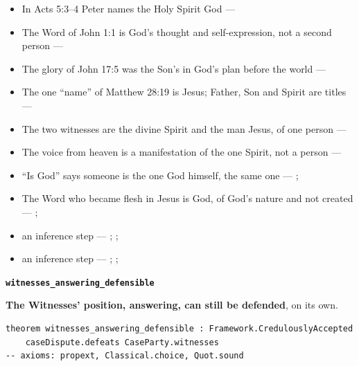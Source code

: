 \documentclass[11pt,paper=\testimonypaper,DIV=13,parskip=false]{scrartcl}
\begin{document}
\begin{itemize}
\begin{itemize}
\item In Acts 5:3–4 Peter names the Holy Spirit God --- \cite[198]{calvin-commentary-acts-1844}
\item The Word of John 1:1 is God’s thought and self-expression, not a second person --- \cite[ch. 4 and 8, on John 1:1]{bernard-oneness-of-god-1983}
\item The glory of John 17:5 was the Son’s in God’s plan before the world --- \cite[ch. 8, The Preexistence of Jesus]{bernard-oneness-of-god-1983}
\item The one “name” of Matthew 28:19 is Jesus; Father, Son and Spirit are titles --- \cite[ch. 6, Matthew 28:19]{bernard-oneness-of-god-1983}
\item The two witnesses are the divine Spirit and the man Jesus, of one person --- \cite[ch. 8, Two Witnesses]{bernard-oneness-of-god-1983}
\item The voice from heaven is a manifestation of the one Spirit, not a person --- \cite[ch. 8, The Voice from Heaven]{bernard-oneness-of-god-1983}
\item “Is God” says someone is the one God himself, the same one --- \cite[ch. 8, Are Jesus and the Father One in Purpose Only?]{bernard-oneness-of-god-1983}; \cite[27]{watchtower-should-you-believe-trinity-1989}
\item The Word who became flesh in Jesus is God, of God’s nature and not created --- \cite[3, The Triune God]{kibbey-living-systematic-theology-2026}; \cite[ch. 4, Conclusion]{bernard-oneness-of-god-1983}
\item an inference step --- \cite[3, The Triune God]{kibbey-living-systematic-theology-2026}; \cite[ch. 4, Conclusion]{bernard-oneness-of-god-1983}; \cite[17--19]{buzzard-caveat-lector-2001}
\item an inference step --- \cite[ch. 8, Are Jesus and the Father One in Purpose Only?]{bernard-oneness-of-god-1983}; \cite[27]{watchtower-should-you-believe-trinity-1989}; \cite[I, q. 28, a. 3]{aquinas-summa-1920}
\end{itemize}
\end{itemize}
\par\medskip\noindent\textbf{\texttt{witnesses\_\allowbreak{}answering\_\allowbreak{}defensible}}\par\nobreak\noindent
\textbf{The Witnesses’ position, answering, can still be defended}, on its own.

{\small\begin{verbatim}
theorem witnesses_answering_defensible : Framework.CredulouslyAccepted
    caseDispute.defeats CaseParty.witnesses
-- axioms: propext, Classical.choice, Quot.sound
\end{verbatim}}
\end{document}
